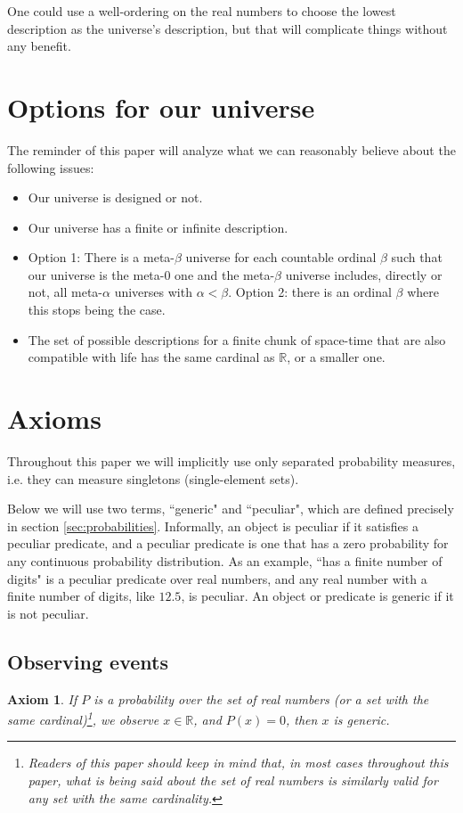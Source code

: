 \documentclass[a4paper
,draft
]{article}
\def\reale{\mathbb{R}}
\newcommand{\ghilimele}[1]{``#1"}
\newtheorem{axiom}{Axiom}
\begin{document}
One could use a well-ordering on the real numbers to choose the
lowest description as the universe's description, but that will
complicate things without any benefit.

\section{Options for our universe}
\label{sec:options}

The reminder of this paper will analyze what we can reasonably believe about
the following issues:
\begin{itemize}
  \item Our universe is designed or not.
  \item Our universe has a finite or infinite description.
  \item Option 1: There is a meta-$\beta$ universe for each countable ordinal
        $\beta$ such that our universe is the meta-$0$ one and the meta-$\beta$
        universe includes, directly or not, all meta-$\alpha$ universes with
        $\alpha < \beta$. Option 2: there is an ordinal $\beta$ where this
        stops being the case.
  \item The set of possible descriptions for a finite chunk of space-time
        that are also compatible with life has the same cardinal as $\reale$,
        or a smaller one.
\end{itemize}

\section{Axioms}
\label{sec:axioms}

Throughout this paper we will implicitly use only separated probability
measures, i.e. they can measure singletons (single-element sets).

Below we will use two terms, \ghilimele{generic} and \ghilimele{peculiar},
which are defined precisely in section \ref{sec:probabilities}. Informally,
an object is peculiar if it satisfies a peculiar predicate, and a peculiar
predicate is one that has a zero probability for any continuous probability
distribution. As an example,
\ghilimele{has a finite number of digits} is a peculiar
predicate over real numbers, and any real number with a finite number
of digits, like $12.5$, is peculiar. An object or predicate is generic if
it is not peculiar.

\subsection{Observing events}
\begin{axiom}
  \label{ax:zeroisgeneric}
  If $P$ is a probability over the set of real numbers
  (or a set with the same cardinal)\footnote{Readers of this paper should
  keep in mind that, in most cases throughout this paper, what is being said
  about the set of real numbers is similarly valid for any set with the same
  cardinality.},
  we observe $x\in\reale$, and $P(x)=0$, then $x$ is generic.
\end{axiom}
\end{document}
